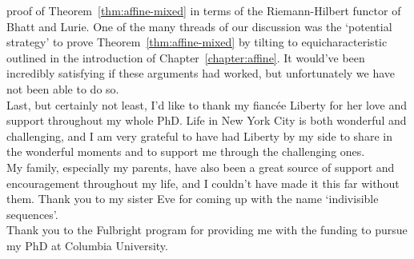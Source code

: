 proof of Theorem~\ref{thm:affine-mixed} in terms of the Riemann-Hilbert functor of Bhatt and Lurie. One of the many threads of our discussion 
was the `potential strategy' to prove Theorem~\ref{thm:affine-mixed} by tilting to equicharacteristic outlined in the introduction of Chapter~\ref{chapter:affine}. 
It would've been incredibly satisfying if these arguments had worked, but unfortunately we have not been able to do so.\\
\indent Last, but certainly not least, I'd like to thank my fiancée Liberty for her love and support throughout my whole PhD. Life in New York City
is both wonderful and challenging, and I am very grateful to have had Liberty by my side to share in the wonderful moments and to support me through the challenging ones.\\
\indent My family, especially my parents, have also been a great source of support and encouragement throughout my life, and I couldn't have 
made it this far without them. Thank you to my sister Eve for coming up with the name `indivisible sequences'.\\
\indent Thank you to the Fulbright program for providing me with the funding to pursue my PhD at Columbia University.